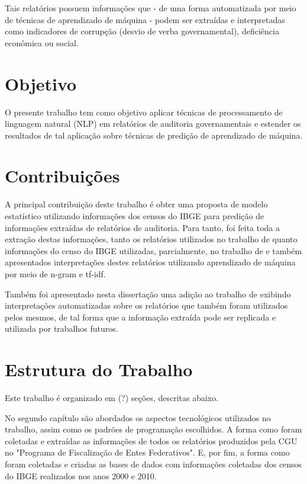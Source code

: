 Tais relatórios possuem informações que - de uma forma automatizada por meio de técnicas de aprendizado de máquina - podem ser extraídas e interpretadas como indicadores de corrupção (desvio de verba governamental), deficiência econômica ou social.

\section{Objetivo}
\label{sec:objetivo}

O presente trabalho tem como objetivo aplicar técnicas de processamento de linguagem natural (NLP) em relatórios de auditoria governamentais e estender os resultados de tal aplicação sobre técnicas de predição de aprendizado de máquina.

\section{Contribuições}
\label{sec:contribuicoes}

A principal contribuição deste trabalho é obter uma proposta de modelo estatístico utilizando informações dos censos do IBGE para predição de informações extraídas de relatórios de auditoria. Para tanto, foi feita toda a extração destas informações, tanto os relatórios utilizados no trabalho de \citep{FerrazFinan2008} quanto informações do censo do IBGE utilizadas, parcialmente, no trabalho de \citep{Goldani2001} e também apresentados interpretações destes relatórios utilizando aprendizado de máquina por meio de n-gram e tf-idf.

Também foi apresentado nesta dissertação uma adição ao trabalho de \citep{FerrazFinan2008} exibindo interpretações automatizadas sobre os relatórios que também foram utilizados pelos mesmos, de tal forma que a informação extraída pode ser replicada e utilizada por trabalhos futuros.

\section{Estrutura do Trabalho}
\label{sec:estrutura_do_trabalho}

Este trabalho é organizado em (?) seções, descritas abaixo.

No segundo capítulo são abordados os aspectos tecnológicos utilizados no trabalho, assim como os padrões de programação escolhidos. A forma como foram coletadas e extraídas as informações de todos os relatórios produzidos pela CGU no "Programa de Fiscalização de Entes Federativos". E, por fim, a forma como foram coletadas e criadas as bases de dados com informações coletadas dos censos do IBGE realizados nos anos 2000 e 2010.


